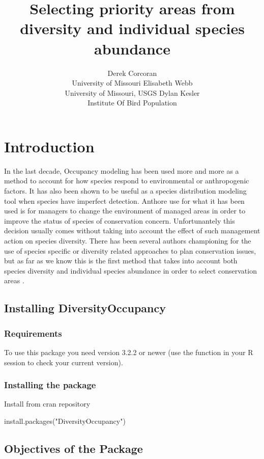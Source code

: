 \documentclass[article]{jss}
\author{
Derek Corcoran\\University of Missouri \And Elisabeth Webb\\University of Missouri, USGS \And Dylan Kesler\\Institute Of Bird Population
}
\title{Selecting priority areas from diversity and individual species abundance
\pkg{DiversityOccupancy}}
\begin{document}
\section{Introduction}\label{introduction}

In the last decade, Occupancy modeling has been used more and more as a
method to account for how species respond to environmental or
anthropogenic factors. It has also been shown to be useful as a species
distribution modeling tool when species have imperfect detection.
Anthore use for what it has been used is for managers to change the
environment of managed areas in order to improve the status of species
of conservation concern. Unfortunantely this decision usually comes
without taking into account the effect of such management action on
species diversity. There has been several authors championing for the
use of species specific or diversity related approaches to plan
conservation issues, but as far as we know this is the first method that
takes into account both species diversity and individual species
abundance in order to select conservation areas
\citep{mackenzie_estimating_2002}.

\subsection{Installing
DiversityOccupancy}\label{installing-diversityoccupancy}

\subsubsection{Requirements}\label{requirements}

To use this package you need  version 3.2.2 or newer (use
the function  in your R session to check your
current version).

\subsubsection{Installing the package}\label{installing-the-package}

Install from cran repository

\begin{CodeChunk}
\begin{CodeInput}
install.packages("DiversityOccupancy")
\end{CodeInput}
\end{CodeChunk}

\subsection{Objectives of the Package}\label{objectives-of-the-package}
\end{document}
